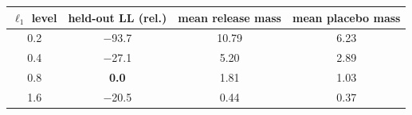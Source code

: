 \begin{tabular}{cccc}
\toprule
$\ell_1$ level & held-out LL (rel.) & mean release mass & mean placebo mass \\
\midrule
0.2 & {$-$93.7} & 10.79 & 6.23 \\
0.4 & {$-$27.1} & 5.20 & 2.89 \\
0.8 & \textbf{0.0} & 1.81 & 1.03 \\
1.6 & {$-$20.5} & 0.44 & 0.37 \\
\bottomrule
\end{tabular}